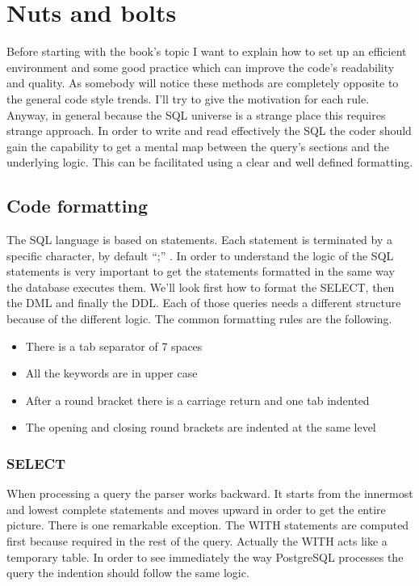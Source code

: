 \chapter{Nuts and bolts}
Before starting with the book's topic I want to explain how to set up an
efficient environment and some good practice which can improve the code's readability and quality.
As somebody will notice these methods are completely opposite to the general code style trends. I'll 
try to give the motivation for each rule. Anyway, in general because the SQL universe is a strange 
place this requires strange approach. In order to write and read effectively the SQL the coder should gain 
the capability to get a mental map  between the query's sections and the underlying logic. This can be 
facilitated using a clear and well defined formatting.\newline

\section{Code formatting}
The SQL language is based on statements. Each statement is terminated by a specific character, by default ``;'' . 
In order to understand the logic of the SQL statements is very important to get the statements formatted in the same 
way the database executes them. We'll look first how to format the SELECT, then the DML and finally the DDL. Each of 
those queries needs a different structure because of the different logic. The common formatting rules are the following.

\begin{itemize}
 \item There is a tab separator of 7 spaces
 \item All the keywords are in upper case
 \item After a round bracket there is a carriage return and one tab indented 
 \item The opening and closing round brackets are indented at the same level
\end{itemize}



\subsection{SELECT}
When processing a query the parser works backward. It starts from the innermost and lowest complete statements and 
moves upward in order to get the entire picture. There is one remarkable exception. The WITH statements are computed 
first because required in the rest of the query. Actually the WITH acts like a temporary table. In order to see 
immediately the way PostgreSQL processes the query the indention should follow the same logic. \newline


